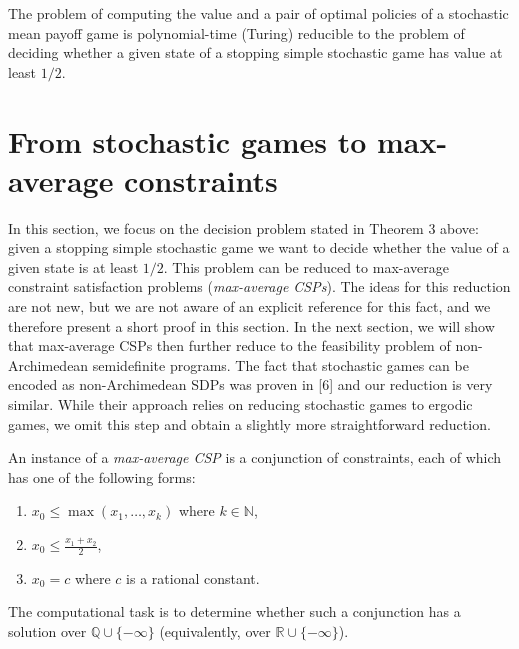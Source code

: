 \setcounter{theorem}{2}
\begin{theorem}[{( [ 6 , Lemma 48] ) }]\label{Thmtheorem3}
The problem of computing the value and a pair of optimal policies of a stochastic mean payoff game is polynomial-time (Turing) reducible to the problem of deciding whether a given state of a stopping simple stochastic game has value at least $1/2$.

\end{theorem}

\section*{From stochastic games to max-average constraints}

In this section, we focus on the decision problem stated in Theorem 3 above: given a stopping simple stochastic game we want to decide whether the value of a given state is at least $1/2$. This problem can be reduced to max-average constraint satisfaction problems (\emph{max-average CSPs}). The ideas for this reduction are not new, but we are not aware of an explicit reference for this fact, and we therefore present a short proof in this section. In the next section, we will show that max-average CSPs then further reduce to the feasibility problem of non-Archimedean semidefinite programs. The fact that stochastic games can be encoded as non-Archimedean SDPs was proven in [6] and our reduction is very similar. While their approach relies on reducing stochastic games to ergodic games, we omit this step and obtain a slightly more straightforward reduction.

\setcounter{theorem}{3}
\begin{definition}\label{Thmtheorem4}
An instance of a \emph{max-average CSP} is a conjunction of constraints, each of which has one of the following forms:


\begin{enumerate}
\item $x_{0}\leq\max(x_{1},\dots,x_{k})$ where $k\in\mathbb{N}$,


\item $x_{0}\leq\frac{x_{1}+x_{2}}{2}$,


\item $x_{0}=c$ where $c$ is a rational constant.


\end{enumerate}
The computational task is to determine whether such a conjunction has a solution over $\mathbb{Q}\cup\{-\infty\}$ (equivalently, over $\mathbb{R}\cup\{-\infty\}$).

\end{definition}

